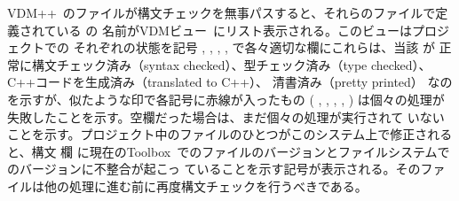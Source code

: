 \documentclass[\pformat,12pt]{jarticle}
\newcommand{\vdmslpp}{VDM++}
\newcommand{\Toolbox}{Toolbox}
\newcommand{\vdmModView}{\guicmd{VDMビュー}}
\newcommand{\guicmd}[1]{{\gt #1}}
\begin{document}
\vdmslpp\ のファイルが構文チェックを無事パスすると、それらのファイルで定義されている
 の
名前が\vdmModView\ にリスト表示される。このビューはプロジェクトでの
 それぞれの状態を記号
,
,
,
,
で各々適切な欄にこれらは、当該 が
正常に構文チェック済み（syntax checked）、型チェック済み（type checked）、
C++コードを生成済み（translated to C++）、
 清書済み（pretty printed）
なのを示すが、似たような印で各記号に赤線が入ったもの
(%
,
,
,
,
)
は個々の処理が失敗したことを示す。空欄だった場合は、まだ個々の処理が実行されて
いないことを示す。プロジェクト中のファイルのひとつがこのシステム上で修正されると、\guicmd{構文} 欄
に現在の\Toolbox\ でのファイルのバージョンとファイルシステムでのバージョンに不整合が起こっ
ていることを示す記号が表示される。そのファイルは他の処理に進む前に再度構文チェックを行うべきである。
\end{document}
